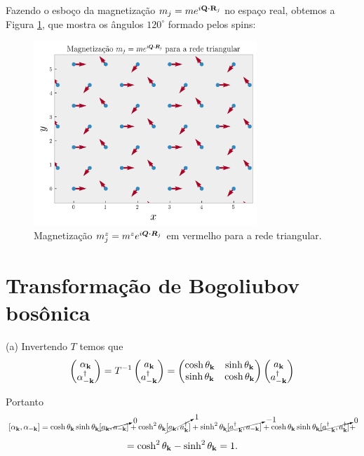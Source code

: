 \documentclass[a4paper,10pt]{article}
\begin{document}
Fazendo o esboço da magnetização $m_j = m e^{i \vb{Q} \vdot \vb{R}_j}$ no espaço real, obtemos a Figura \ref{fig:mag-triang}, que mostra os ângulos $120^\circ$ formado pelos spins:
\begin{figure}[H]
\centering
\includegraphics[width=0.75\textwidth]{fig/mag_triang-real_space.png}
\caption{Magnetização $m^z_j = m^z e^{i \bm{Q} \vdot \bm{R}_j}$ em vermelho para a rede triangular.}
\label{fig:mag-triang}
\end{figure}

\pagebreak

\section{Transformação de Bogoliubov bosônica}

(a) Invertendo $T$ temos que
$$
\begin{pmatrix}
\alpha_{\vb{k}} \\ \alpha_{-\vb{k}}^\dagger
\end{pmatrix}
=
T^{-1}
\begin{pmatrix}
a_{\vb{k}} \\ a_{-\vb{k}}^\dagger
\end{pmatrix}
=
\begin{pmatrix}
\cosh\theta_{\vb{k}} & \sinh\theta_{\vb{k}} \\
\sinh\theta_{\vb{k}} & \cosh\theta_{\vb{k}}
\end{pmatrix}
\begin{pmatrix}
a_{\vb{k}} \\ a_{-\vb{k}}^\dagger
\end{pmatrix}
$$

Portanto
$$
[\alpha_{\vb{k}}, \alpha_{-\vb{k}}] =
\cosh\theta_{\vb{k}}\sinh\theta_{\vb{k}} \cancelto{0}{[a_{\vb{k}}, a_{-\vb{k}}]} +
\cosh^2\theta_{\vb{k}} \cancelto{1}{[a_{\vb{k}}, a_{\vb{k}}^\dagger]} +
\sinh^2\theta_{\vb{k}} \cancelto{-1}{[a_{-\vb{k}}^\dagger, a_{-\vb{k}}]} +
\cosh\theta_{\vb{k}}\sinh\theta_{\vb{k}} \cancelto{0}{[a_{-\vb{k}}^\dagger, a_{\vb{k}}^\dagger]} +
$$
$$
= \cosh^2\theta_{\vb{k}} - \sinh^2\theta_{\vb{k}} = 1.
$$
\end{document}
